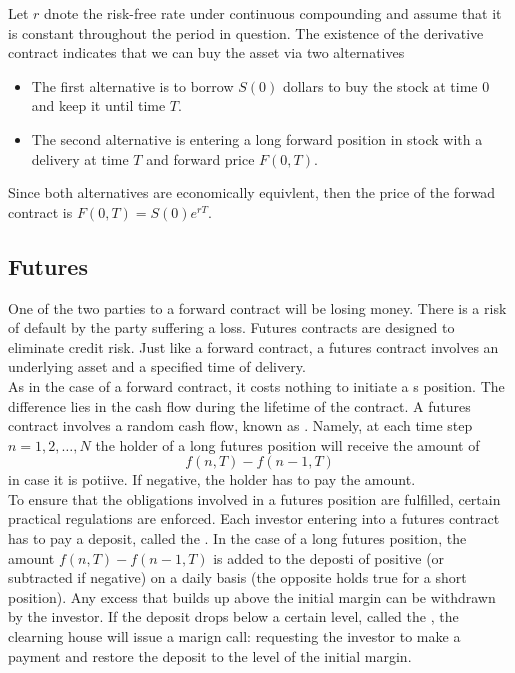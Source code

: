 \documentclass{article}
\begin{document}
Let $r$ dnote the risk-free rate under continuous compounding and assume that it is constant throughout the period in question. The existence of the derivative contract indicates that we can buy the asset via two alternatives 
\begin{itemize}
  \item The first alternative is to borrow $S(0)$ dollars to buy the stock at time $0$ and keep it until time $T$. 
  \item The second alternative is entering a long forward position in stock with a delivery at time $T$ and forward price $F(0,T)$. 
\end{itemize}
Since both alternatives are economically equivlent, then the price of the forwad contract is $F(0,T) = S(0) e^{rT}$. \\ 

\subsection{Futures}

One of the two parties to a forward contract will be losing money. There is a risk of default by the party suffering a loss. Futures contracts are designed to eliminate credit risk. Just like a forward contract, a futures contract involves an underlying asset and a specified time of delivery. \\ 

As in the case of a forward contract, it costs nothing to initiate a s position. The difference lies in the cash flow during the lifetime of the contract. A futures contract involves a random cash flow, known as . Namely, at each time step $n=1,2, \dots, N$ the holder of a long futures position will receive the amount of $$f(n,T) - f(n-1, T)$$ in case it is potiive. If negative, the holder has to pay the amount. \\ 

To ensure that the obligations involved in a futures position are fulfilled, certain practical regulations are enforced. Each investor entering into a futures contract has to pay a deposit, called the . In the case of a long futures position, the amount $f(n,T) - f(n-1, T)$ is added to the deposti of positive (or subtracted if negative) on a daily basis (the opposite holds true for a short position). Any excess that builds up above the initial margin can be withdrawn by the investor. If the deposit drops below a certain level, called the , the clearning house will issue a marign call: requesting the investor to make a payment and restore the deposit to the level of the initial margin. \\ 
\end{document}

